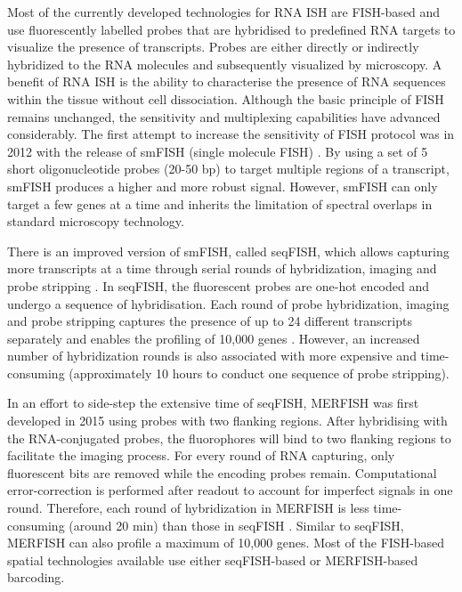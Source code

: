 Most of the currently developed technologies for RNA ISH are FISH-based and use fluorescently labelled probes that are hybridised to predefined RNA targets to visualize the presence of transcripts. Probes are either directly or indirectly hybridized to the RNA molecules and subsequently visualized by microscopy. A benefit of RNA ISH is the ability to characterise the presence of RNA sequences within the tissue without cell dissociation. Although the basic principle of FISH remains unchanged, the sensitivity and multiplexing capabilities have advanced considerably. The first attempt to increase the sensitivity of FISH protocol was in 2012 with the release of smFISH (single molecule FISH) \cite{ji2012single}. By using a set of 5 short oligonucleotide probes (20-50 bp) to target multiple regions of a transcript, smFISH produces a higher and more robust signal. However, smFISH can only target a few genes at a time and inherits the limitation of spectral overlaps in standard microscopy technology.

There is an improved version of smFISH, called seqFISH, which allows capturing more transcripts at a time through serial rounds of hybridization, imaging and probe stripping \cite{asp2020spatially}. In seqFISH, the fluorescent probes are one-hot encoded and undergo a sequence of hybridisation. Each round of probe hybridization, imaging and probe stripping captures the presence of up to 24 different transcripts separately and enables the profiling of 10,000 genes \cite{moses2022museum,eng2019transcriptome}. However, an increased number of hybridization rounds is also associated with more expensive and time-consuming (approximately 10 hours to conduct one sequence of probe stripping). 

In an effort to side-step the extensive time of seqFISH, MERFISH was first developed in 2015 \cite{chen2015spatially} using probes with two flanking regions. After hybridising with the RNA-conjugated probes, the fluorophores will bind to two flanking regions to facilitate the imaging process. For every round of RNA capturing, only fluorescent bits are removed while the encoding probes remain. Computational error-correction is performed after readout to account for imperfect signals in one round. Therefore, each round of hybridization in MERFISH is less time-consuming (around 20 min) than those in seqFISH \cite{moses2022museum}. Similar to seqFISH, MERFISH can also profile a maximum of 10,000 genes. Most of the FISH-based spatial technologies available use either seqFISH-based or MERFISH-based barcoding. 

